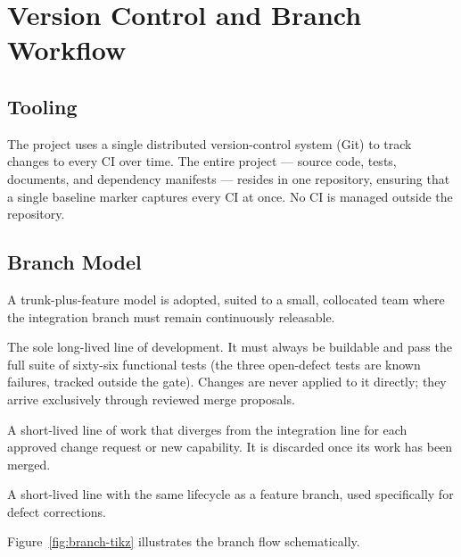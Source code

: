 \section{Version Control and Branch Workflow}
\label{sec:scm-vc}

\subsection{Tooling}

The project uses a single distributed version-control system (Git) to track changes
to every CI over time. The entire project --- source code, tests, documents, and
dependency manifests --- resides in one repository, ensuring that a single baseline
marker captures every CI at once. No CI is managed outside the repository.

\subsection{Branch Model}

A trunk-plus-feature model is adopted, suited to a small, collocated team
where the integration branch must remain continuously releasable.

\begin{description}[leftmargin=1.6cm, style=nextline]
  \item[Integration line]
    The sole long-lived line of development. It must always be buildable and pass
    the full suite of sixty-six functional tests (the three open-defect tests are
    known failures, tracked outside the gate). Changes are never applied to it
    directly; they arrive exclusively through reviewed merge proposals.
  \item[Feature branch]
    A short-lived line of work that diverges from the integration line for each
    approved change request or new capability. It is discarded once its work has
    been merged.
  \item[Fix branch]
    A short-lived line with the same lifecycle as a feature branch, used
    specifically for defect corrections.
\end{description}

Figure~\ref{fig:branch-tikz} illustrates the branch flow schematically.

